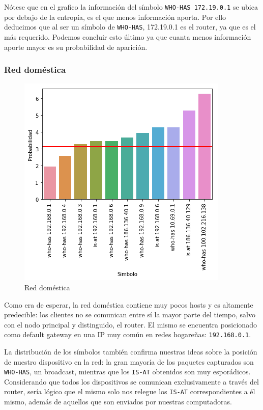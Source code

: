 Nótese que en el grafico la información del símbolo \texttt{WHO-HAS 172.19.0.1} se ubica por debajo de la entropía, es el que menos información aporta. Por ello deducimos que al ser un símbolo de \texttt{WHO-HAS}, 172.19.0.1 es el router, ya que es el más requerido. Podemos concluir esto último ya que cuanta menos información aporte mayor es su probabilidad de aparición.


\subsubsection{Red doméstica}

\begin{figure}[H]
	\centering
	\includegraphics[width=.5\linewidth]{imagenes/manu_casa_hosts}
	\caption{Red doméstica}
\end{figure}


Como era de esperar, la red doméstica contiene muy pocos hosts y es altamente predecible: los clientes no se comunican entre sí la mayor parte del tiempo, salvo con el nodo principal y distinguido, el router. El mismo se encuentra posicionado como default gateway en una IP muy común en redes hogareñas: \texttt{192.168.0.1}.

La distribución de los símbolos también confirma nuestras ideas sobre la posición de nuestro dispositivo en la red: la gran mayoría de los paquetes capturados son \texttt{WHO-HAS}, un broadcast, mientras que los \texttt{IS-AT} obtenidos son muy esporádicos. Considerando que todos los dispositivos se comunican exclusivamente a través del router, sería lógico que el mismo solo nos relegue los \texttt{IS-AT} correspondientes a él mismo, además de aquellos que son enviados por nuestras computadoras.

